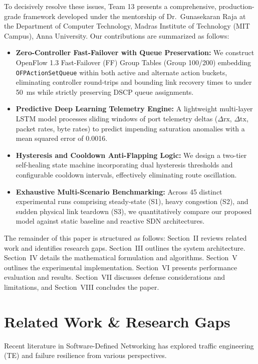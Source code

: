 \documentclass[conference]{IEEEtran}
\begin{document}
To decisively resolve these issues, Team 13 presents a comprehensive, production-grade framework developed under the mentorship of Dr.~Gunasekaran Raja at the Department of Computer Technology, Madras Institute of Technology (MIT Campus), Anna University. Our contributions are summarized as follows:
\begin{itemize}
    \item \textbf{Zero-Controller Fast-Failover with Queue Preservation:} We construct OpenFlow 1.3 Fast-Failover (FF) Group Tables (Group 100/200) embedding \texttt{OFPActionSetQueue} within both active and alternate action buckets, eliminating controller round-trips and bounding link recovery times to under 50~ms while strictly preserving DSCP queue assignments.
    \item \textbf{Predictive Deep Learning Telemetry Engine:} A lightweight multi-layer LSTM model processes sliding windows of port telemetry deltas ($\Delta \text{rx}$, $\Delta \text{tx}$, packet rates, byte rates) to predict impending saturation anomalies with a mean squared error of 0.0016.
    \item \textbf{Hysteresis and Cooldown Anti-Flapping Logic:} We design a two-tier self-healing state machine incorporating dual hysteresis thresholds and configurable cooldown intervals, effectively eliminating route oscillation.
    \item \textbf{Exhaustive Multi-Scenario Benchmarking:} Across 45 distinct experimental runs comprising steady-state (S1), heavy congestion (S2), and sudden physical link teardown (S3), we quantitatively compare our proposed model against static baseline and reactive SDN architectures.
\end{itemize}

The remainder of this paper is structured as follows: Section~II reviews related work and identifies research gaps. Section~III outlines the system architecture. Section~IV details the mathematical formulation and algorithms. Section~V outlines the experimental implementation. Section~VI presents performance evaluation and results. Section~VII discusses defense considerations and limitations, and Section~VIII concludes the paper.

\section{Related Work \& Research Gaps}
Recent literature in Software-Defined Networking has explored traffic engineering (TE) and failure resilience from various perspectives.
\end{document}
